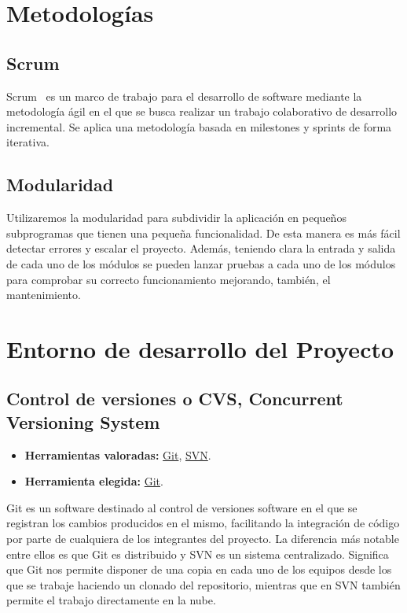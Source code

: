 \section{Metodologías}
\subsection{Scrum}\label{4:SCRUM}
Scrum~\cite{manual:Scrum} es un marco de trabajo para el desarrollo de software mediante la metodología ágil en el que se busca realizar un trabajo colaborativo de desarrollo incremental. Se aplica una metodología basada en milestones y sprints de forma iterativa.

\subsection{Modularidad}\label{4:Modularidad}
Utilizaremos la modularidad para subdividir la aplicación en pequeños subprogramas que tienen una pequeña funcionalidad. De esta manera es más fácil detectar errores y escalar el proyecto. Además, teniendo clara la entrada y salida de cada uno de los módulos se pueden lanzar pruebas a cada uno de los módulos para comprobar su correcto funcionamiento mejorando, también, el mantenimiento.

\section{Entorno de desarrollo del Proyecto}

\subsection{Control de versiones o CVS, Concurrent Versioning System}\label{4:controlVersiones}
\begin{itemize}
    \item \textbf{Herramientas valoradas:} \href{https://git-scm.com/}{Git}, \href{https://subversion.apache.org/}{SVN}.
    \item \textbf{Herramienta elegida:} \href{https://git-scm.com/}{Git}.
\end{itemize}

Git es un software destinado al control de versiones software en el que se registran los cambios producidos en el mismo, facilitando la integración de código por parte de cualquiera de los integrantes del proyecto.
La diferencia más notable entre ellos es que Git es distribuido y SVN es un sistema centralizado. Significa que Git nos permite disponer de una copia en cada uno de los equipos desde los que se trabaje haciendo un clonado del repositorio, mientras que en SVN también permite el trabajo directamente en la nube.

